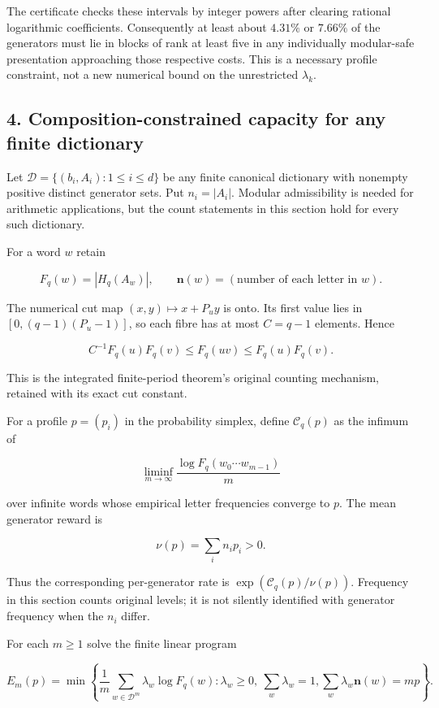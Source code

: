 \documentclass[11pt,a4paper]{article}
\begin{document}
The certificate checks these intervals by integer powers after clearing rational logarithmic coefficients. Consequently at least about \(4.31\%\) or \(7.66\%\) of the generators must lie in blocks of rank at least five in any individually modular-safe presentation approaching those respective costs. This is a necessary profile constraint, not a new numerical bound on the unrestricted \(\lambda_k\).

\subsection{4. Composition-constrained capacity for any finite dictionary}\label{eporig:composition-constrained-capacity-for-any-finite-dictionary}

Let \(\mathcal D=\{(b_i,A_i):1\le i\le d\}\) be any finite canonical dictionary with nonempty positive distinct generator sets. Put \(n_i=|A_i|\). Modular admissibility is needed for arithmetic applications, but the count statements in this section hold for every such dictionary.

For a word \(w\) retain

\[
F_q(w)=|H_q(A_w)|,
\qquad \mathbf n(w)=(\text{number of each letter in }w).
\]

The numerical cut map \((x,y)\mapsto x+P_uy\) is onto. Its first value lies in \([0,(q-1)(P_u-1)]\), so each fibre has at most \(C=q-1\) elements. Hence

\[
\boxed{C^{-1}F_q(u)F_q(v)\le F_q(uv)\le F_q(u)F_q(v).}
\tag{4.1}
\]

This is the integrated finite-period theorem's original counting mechanism, retained with its exact cut constant.

For a profile \(p=(p_i)\) in the probability simplex, define \(\mathcal C_q(p)\) as the infimum of

\[
\liminf_{m\to\infty}\frac{\log F_q(w_0\cdots w_{m-1})}{m}
\]

over infinite words whose empirical letter frequencies converge to \(p\). The mean generator reward is

\[
\nu(p)=\sum_i n_i p_i>0.
\]

Thus the corresponding per-generator rate is \(\exp(\mathcal C_q(p)/\nu(p))\). Frequency in this section counts original levels; it is not silently identified with generator frequency when the \(n_i\) differ.

For each \(m\ge1\) solve the finite linear program

\[
E_m(p)=\min\left\{
\frac1m\sum_{w\in\mathcal D^m}\lambda_w\log F_q(w):
\lambda_w\ge0,\ \sum_w\lambda_w=1,
\sum_w\lambda_w\mathbf n(w)=mp
\right\}.
\tag{4.2}
\]
\end{document}
